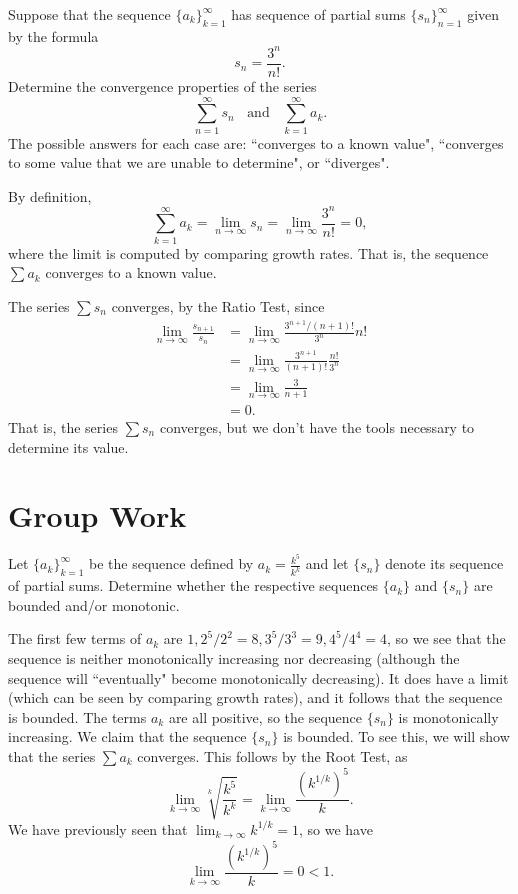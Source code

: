 \documentclass[]{ximera}
\begin{document}
\begin{problem}
Suppose that the sequence $\{a_k\}_{k=1}^\infty$ has sequence of partial sums $\{s_n\}_{n=1}^\infty$ given by the formula
$$
s_n = \frac{3^n}{n!}.
$$
Determine the convergence properties of the series 
$$
\sum_{n=1}^\infty s_n \;\; \mbox{ and } \;\; \sum_{k=1}^\infty a_k. 
$$
The possible answers for each case are: ``converges to a known value", ``converges to some value that we are unable to determine", or ``diverges".

\begin{solution}
By definition,
$$
\sum_{k=1}^\infty a_k = \lim_{n\rightarrow \infty} s_n = \lim_{n\rightarrow \infty} \frac{3^n}{n!} = 0,
$$
where the limit is computed by comparing growth rates. That is, the sequence $\sum a_k$ converges to a known value.

The series $\sum s_n$ converges, by the Ratio Test, since
\begin{align*}
\lim_{n \rightarrow \infty} \frac{s_{n+1}}{s_n} &= \lim_{n \rightarrow \infty} \frac{3^{n+1}/(n+1)!}{3^n}{n!} \\
&= \lim_{n \rightarrow \infty} \frac{3^{n+1}}{(n+1)!} \frac{n!}{3^n} \\
&= \lim_{n \rightarrow \infty} \frac{3}{n+1} \\
&= 0.
\end{align*}
That is, the series $\sum s_n$ converges, but we don't have the tools necessary to determine its value. 
\end{solution}
\end{problem}

\section{Group Work}

\begin{problem}
Let $\{a_k\}_{k=1}^\infty$ be the sequence defined by $a_k = \frac{k^5}{k^k}$ and let $\{s_n\}$ denote its sequence of partial sums. Determine whether the respective sequences $\{a_k\}$ and $\{s_n\}$ are bounded and/or monotonic.

\begin{solution}
The first few terms of $a_k$ are $1, 2^5/2^2 = 8, 3^5/3^3 = 9, 4^5/4^4 = 4$, so we see that the sequence is neither monotonically increasing nor decreasing (although the sequence will ``eventually" become monotonically decreasing). It does have a limit (which can be seen by comparing growth rates), and it follows that the sequence is bounded. The terms $a_k$ are all positive, so the sequence $\{s_n\}$ is monotonically increasing. We claim that the sequence $\{s_n\}$ is bounded. To see this, we will show that the series $\sum a_k$ converges. This follows by the Root Test, as 
$$
\lim_{k\rightarrow \infty} \sqrt[k]{\frac{k^5}{k^k}} = \lim_{k\rightarrow \infty} \frac{(k^{1/k})^5}{k}.
$$
We have previously seen that $\lim_{k\rightarrow \infty} k^{1/k} = 1$, so we have 
$$
\lim_{k\rightarrow \infty} \frac{(k^{1/k})^5}{k} = 0 < 1.
$$
\end{solution}
\end{problem}
\end{document}
